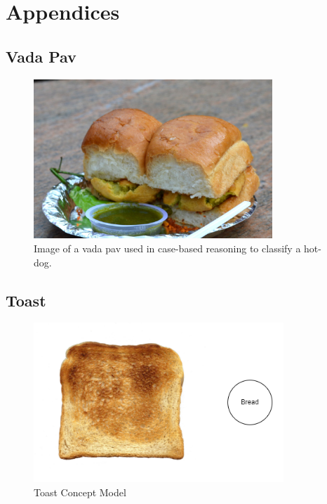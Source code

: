\section{Appendices}
\subsection{Vada Pav}
\label{appendix:vadapav}
\begin{figure}[H]
	\centering
	\includegraphics[height=6cm]{Figures/VadaPaav.JPG}
	\caption{Image of a vada pav used in case-based reasoning to classify a hot-dog.}
	\label{fig:vadapav}
\end{figure}

\subsection{Toast}
\label{appendix:toast}
\begin{figure}[H]
	\centering
	\includegraphics[height=6cm]{Figures/toast.png}
	\caption{Toast Concept Model}
	\label{fig:toast}
\end{figure}


